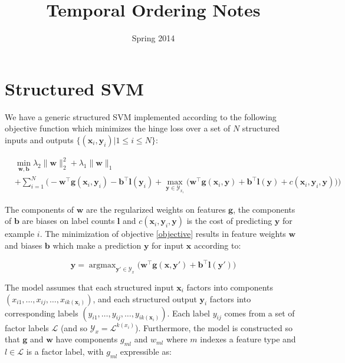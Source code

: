 \documentclass[11pt,letterpaper]{article}
\title{Temporal Ordering Notes}
\date{Spring 2014}
\DeclareMathOperator*{\argmax}{argmax}
\begin{document}
\maketitle

\section{Structured SVM}

We have a generic structured SVM implemented according to the following objective
function which minimizes the hinge loss over a set of $N$ structured inputs and
outputs $\{(\mathbf{x}_i,\mathbf{y}_i)|1\leq i \leq N\}$:

\begin{equation}
\begin{split}
\label{objective}
& \min_{\mathbf{w},  \mathbf{b}} \lambda_2\|\mathbf{w}\|_2^2+\lambda_1\|\mathbf{w}\|_1 \\
 & +\sum_{i=1}^N\bigg(-\mathbf{w}^\top \mathbf{g}(\mathbf{x}_i,\mathbf{y}_i)-\mathbf{b}^\top \mathbf{l}(\mathbf{y}_i)+\max_{\mathbf{y}\in \mathcal{Y}_{x_i}}\Big(\mathbf{w}^\top\mathbf{g}(\mathbf{x}_i,\mathbf{y})+\mathbf{b}^\top \mathbf{l}(\mathbf{y})+c(\mathbf{x}_i,\mathbf{y}_i,\mathbf{y})\Big)\bigg)
\end{split}
\end{equation}

The components of $\mathbf{w}$ are the regularized weights on features 
$\mathbf{g}$, the components of $\mathbf{b}$ are biases on label counts 
$\mathbf{l}$ and $c(\mathbf{x}_i,\mathbf{y}_i,\mathbf{y})$ is the cost of predicting
$\mathbf{y}$ for example $i$.  The minimization of objective \ref{objective} 
results in feature weights $\mathbf{w}$ and biases $\mathbf{b}$ which
make a prediction $\mathbf{y}$ for input $\mathbf{x}$ according to:

\begin{equation}
\label{prediction}
\mathbf{y}=\argmax_{\mathbf{y}'\in\mathcal{Y}_x}\Big( \mathbf{w}^\top \mathbf{g}(\mathbf{x},\mathbf{y}')+\mathbf{b}^\top\mathbf{l}(\mathbf{y}') \Big)
\end{equation}

The model assumes that each structured input $\mathbf{x}_i$ factors into components $(x_{i1},\hdots,x_{ij},\hdots,x_{ik(\mathbf{x}_i)})$, 
and each structured output $\mathbf{y}_i$ factors into corresponding labels
 $(y_{i1},\hdots,y_{ij},\hdots,y_{ik(\mathbf{x}_i)})$.  Each label $y_{ij}$ 
 comes from a set of factor labels $\mathcal{L}$ (and so $\mathcal{Y}_x=\mathcal{L}^{k(x_i)}$).
Furthermore, the model is constructed so that $\mathbf{g}$ and 
$\mathbf{w}$ have components $g_{ml}$ and $w_{ml}$ where $m$ indexes a 
feature type and $l\in\mathcal{L}$ is a factor label, with $g_{ml}$ expressible
as:
\end{document}
